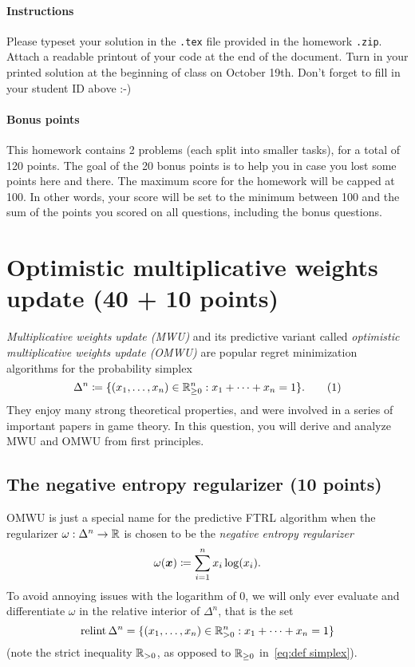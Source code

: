 \documentclass{homework}
\newcommand{\negent}{\omega}
\begin{document}
\maketitle

\paragraph{Instructions} Please typeset your solution in the \texttt{.tex} file provided in the homework \texttt{.zip}. Attach a readable printout of your code at the end of the document. Turn in your printed solution at the beginning of class on October 19th. Don't forget to fill in your student ID above :-)

\paragraph{Bonus points} This homework contains 2 problems (each split into smaller tasks), for a total of 120 points. The goal of the 20 bonus points is to help you in case you lost some points here and there. The maximum score for the homework will be capped at 100. In other words, your score will be set to the minimum between 100 and the sum of the points you scored on all questions, including the bonus questions.

\section{Optimistic multiplicative weights update (40 + 10 points)}

\emph{Multiplicative weights update (MWU)} and its predictive variant called
\emph{optimistic multiplicative weights update (OMWU)} are popular regret minimization algorithms for the probability simplex
\[
    \Delta^n \defeq \{(x_1, \dots, x_n) \in \bbR^n_{\ge 0}: x_1 + \dots + x_n = 1\}.
    \numberthis{eq:def simplex}
\]
They enjoy many strong theoretical properties, and were involved in a series of important papers in game theory.
%
In this question, you will derive and analyze MWU and OMWU from first principles.

\subsection{The negative entropy regularizer (10 points)}

OMWU is just a special name for the predictive FTRL algorithm when the regularizer $\negent : \Delta^n \to \bbR$ is chosen to be the \emph{negative entropy regularizer} 
\[
    \negent(\vec{x}) \defeq \sum_{i=1}^n x_i \log(x_i).
\]
To avoid annoying issues with the logarithm of $0$, we will only ever evaluate and differentiate $\negent$ in the relative interior of $\Delta^n$, that is the set 
\[
    \operatorname{relint} \Delta^n = \{(x_1, \dots, x_n) \in \mathbb{R}^n_{> 0}: x_1 + \dots + x_n = 1\}
\]
(note the strict inequality $\mathbb{R}_{> 0}$, as opposed to $\mathbb{R}_{\ge 0}$ in~\eqref{eq:def simplex}).
\end{document}
